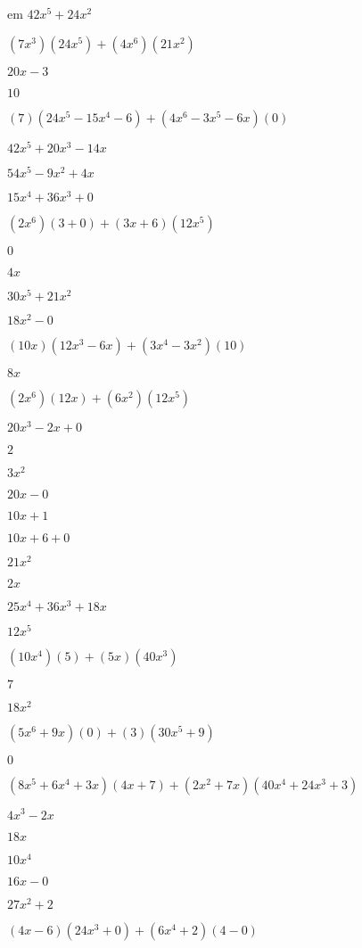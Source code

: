 \documentclass{article}
\begin{document}
\begin{multicols}{2}
em $42x^{5}+24x^{2}$\item $(7x^{3})(24x^{5})+(4x^{6})(21x^{2})$\item $20x-3$\item $10$\item $(7)(24x^{5}-15x^{4}-6)+(4x^{6}-3x^{5}-6x)(0)$\item $42x^{5}+20x^{3}-14x$\item $54x^{5}-9x^{2}+4x$\item $15x^{4}+36x^{3}+0$\item $(2x^{6})(3+0)+(3x+6)(12x^{5})$\item $0$\item $4x$\item $30x^{5}+21x^{2}$\item $18x^{2}-0$\item $(10x)(12x^{3}-6x)+(3x^{4}-3x^2)(10)$\item $8x$\item $(2x^{6})(12x)+(6x^2)(12x^{5})$\item $20x^{3}-2x+0$\item $2$\item $3x^{2}$\item $20x-0$\item $10x+1$\item $10x+6+0$\item $21x^{2}$\item $2x$\item $25x^{4}+36x^{3}+18x$\item $12x^{5}$\item $(10x^{4})(5)+(5x)(40x^{3})$\item $7$\item $18x^{2}$\item $(5x^{6}+9x)(0)+(3)(30x^{5}+9)$\item $0$\item $(8x^{5}+6x^{4}+3x)(4x+7)+(2x^2+7x)(40x^{4}+24x^{3}+3)$\item $4x^{3}-2x$\item $18x$\item $10x^{4}$\item $16x-0$\item $27x^{2}+2$\item $(4x-6)(24x^{3}+0)+(6x^{4}+2)(4-0)$\ite
\end{multicols}
\end{document}
